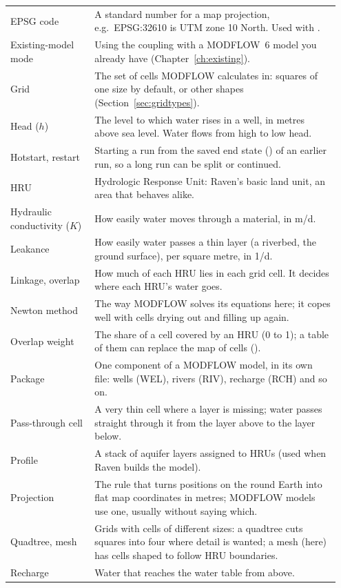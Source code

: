 \begin{longtable}{P{0.24\linewidth}P{0.708\linewidth}}
EPSG code & A standard number for a map projection, e.g.\ EPSG:32610 is UTM zone 10 North. Used with .\\
Existing-model mode & Using the coupling with a MODFLOW~6 model you already have (Chapter~\ref{ch:existing}).\\
Grid & The set of cells MODFLOW calculates in: squares of one size by default, or other shapes (Section~\ref{sec:gridtypes}).\\
Head ($h$) & The level to which water rises in a well, in metres above sea level. Water flows from high to low head.\\
Hotstart, restart & Starting a run from the saved end state () of an earlier run, so a long run can be split or continued.\\
HRU & Hydrologic Response Unit: Raven's basic land unit, an area that behaves alike.\\
Hydraulic conductivity ($K$) & How easily water moves through a material, in m/d.\\
Leakance & How easily water passes a thin layer (a riverbed, the ground surface), per square metre, in 1/d.\\
Linkage, overlap & How much of each HRU lies in each grid cell. It decides where each HRU's water goes.\\
Newton method & The way MODFLOW solves its equations here; it copes well with cells drying out and filling up again.\\
Overlap weight & The share of a cell covered by an HRU (0 to 1); a table of them can replace the map of cells ().\\
Package & One component of a MODFLOW model, in its own file: wells (WEL), rivers (RIV), recharge (RCH) and so on.\\
Pass-through cell & A very thin cell where a layer is missing; water passes straight through it from the layer above to the layer below.\\
Profile & A stack of aquifer layers assigned to HRUs (used when Raven builds the model).\\
Projection & The rule that turns positions on the round Earth into flat map coordinates in metres; MODFLOW models use one, usually without saying which.\\
Quadtree, mesh & Grids with cells of different sizes: a quadtree cuts squares into four where detail is wanted; a mesh (here) has cells shaped to follow HRU boundaries.\\
Recharge & Water that reaches the water table from above.\\

\end{longtable}
